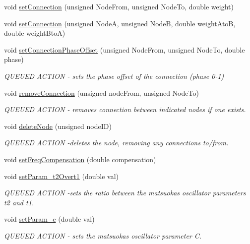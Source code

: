 \begin{DoxyCompactItemize}
void \hyperlink{classMatsuokaEngine_a716d4e8f1dc446179c5424007995ab59}{set\+Connection} (unsigned Node\+From, unsigned Node\+To, double weight)
\item 
void \hyperlink{classMatsuokaEngine_a1335ac9672e6443135d78a8192b5aad5}{set\+Connection} (unsigned NodeA, unsigned NodeB, double weight\+AtoB, double weight\+BtoA)
\item 
void \hyperlink{classMatsuokaEngine_a22045d1c6d6c8bcf2b282c9c98e46f13}{set\+Connection\+Phase\+Offset} (unsigned Node\+From, unsigned Node\+To, double phase)
\begin{DoxyCompactList}\small\item\em Q\+U\+E\+U\+ED A\+C\+T\+I\+ON -\/ sets the phase offset of the connection (phase 0-\/1) \end{DoxyCompactList}\item 
void \hyperlink{classMatsuokaEngine_a5a6d42576cafa238d020e62bdc9e2204}{remove\+Connection} (unsigned node\+From, unsigned Node\+To)
\begin{DoxyCompactList}\small\item\em Q\+U\+E\+U\+ED A\+C\+T\+I\+ON -\/ removes connection between indicated nodes if one exists. \end{DoxyCompactList}\item 
void \hyperlink{classMatsuokaEngine_a475f866cfa6cf0e4249483a4ea2d5816}{delete\+Node} (unsigned node\+ID)
\begin{DoxyCompactList}\small\item\em Q\+U\+E\+U\+ED A\+C\+T\+I\+ON -\/deletes the node, removing any connections to/from. \end{DoxyCompactList}\item 
void \hyperlink{classMatsuokaEngine_a1b932496b53001762dd0224eced6bd09}{set\+Freq\+Compensation} (double compensation)
\item 
void \hyperlink{classMatsuokaEngine_a22a2a27ba2ad7f8ea7a4121326ac8a21}{set\+Param\+\_\+t2\+Overt1} (double val)
\begin{DoxyCompactList}\small\item\em Q\+U\+E\+U\+ED A\+C\+T\+I\+ON -\/sets the ratio between the matsuoka\textquotesingle{}s oscillator parameters t2 and t1. \end{DoxyCompactList}\item 
void \hyperlink{classMatsuokaEngine_ad210d56ae83d896c39e72d93a6263035}{set\+Param\+\_\+c} (double val)
\begin{DoxyCompactList}\small\item\em Q\+U\+E\+U\+ED A\+C\+T\+I\+ON -\/ sets the matsuoka\textquotesingle{}s oscillator parameter C. \end{DoxyCompactList}\item 

\end{DoxyCompactItemize}
